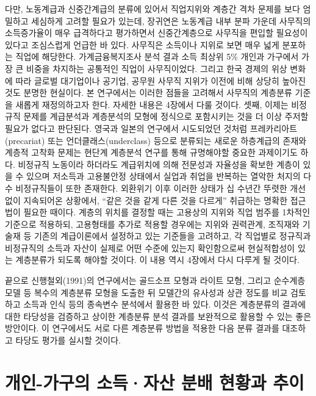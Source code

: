 \documentclass[
  letterpaper,
  DIV=11,
  numbers=noendperiod]{scrartcl}
\begin{document}
다만, 노동계급과 신중간계급의 분류에 있어서 직업지위와 계층간 격차
문제를 보다 엄밀하고 세심하게 고려할 필요가 있는데, 장귀연은 노동계급
내부 분파 가운데 사무직의 소득증가율이 매우 급격하다고 평가하면서
신중간계층으로 사무직을 편입할 필요성이 있다고 조심스럽게 언급한 바
있다. 사무직은 소득이나 지위로 보면 매우 넓게 분포하는 직업에 해당한다.
가계금융복지조사 분석 결과 소득 최상위 5\% 개인과 가구에서 가장 큰
비중을 차지하는 공통적인 직업이 사무직이었다. 그리고 한국 경제의 위상
변화에 따라 글로벌 대기업이나 공기업, 공무원 사무직 지위가 이전에 비해
상당히 높아진 것도 분명한 현실이다. 본 연구에서는 이러한 점들을 고려해서
사무직의 계층분류 기준을 새롭게 재정의하고자 한다. 자세한 내용은 4장에서
다룰 것이다. 셋째, 이제는 비정규직 문제를 계급분석과 계층분석의 모형에
정식으로 포함시키는 것을 더 이상 주저할 필요가 없다고 판단된다. 영국과
일본의 연구에서 시도되었던 것처럼 프레카리아트(precariat) 또는
언더클래스(underclass) 등으로 분류되는 새로운 하층계급의 존재와 계층적
고착화 문제는 현단계 계층분석 연구를 통해 규명해야할 중요한 과제이기도
하다. 비정규직 노동이라 하더라도 계급위치에 의해 전문성과 자율성을
확보한 계층이 있을 수 있으며 저소득과 고용불안정 상태에서 실업과 취업을
반복하는 열악한 처지의 다수 비정규직들이 또한 존재한다. 외환위기 이후
이러한 상태가 십 수년간 뚜렷한 개선 없이 지속되어온 상황에서, ``같은
것을 같게 다른 것을 다르게'' 취급하는 명확한 접근법이 필요한 때이다.
계층의 위치를 결정할 때는 고용상의 지위와 직업 범주를 1차적인 기준으로
적용하되, 고용형태를 추가로 적용할 경우에는 지위와 권력관계, 조직재와
기술재 등 기존의 계급이론에서 설정하고 있는 기준들을 고려하고, 각
직업별로 정규직과 비정규직의 소득과 자산이 실제로 어떤 수준에 있는지
확인함으로써 현실적합성이 있는 계층분류가 되도록 해야할 것이다. 이 내용
역시 4장에서 다시 다루게 될 것이다.

끝으로 신행철외(1991)의 연구에서는 골드소프 모형과 라이트 모형, 그리고
순수계층모델 등 복수의 계층분류 모형을 도출한 뒤 모델간의 유사성과 상관
정도를 비교 검토하고 소득과 인식 등의 종속변수 분석에서 활용한 바 있다.
이것은 계층분류의 결과에 대한 타당성을 검증하고 상이한 계층분류 분석
결과를 보완적으로 활용할 수 있는 좋은 방안이다. 이 연구에서도 서로 다른
계층분류 방법을 적용한 다음 분류 결과를 대조하고 타당도 평가를 실시할
것이다.

\section{개인-가구의 소득·자산 분배 현황과
추이}\label{uxac1cuxc778-uxac00uxad6cuxc758-uxc18cuxb4dduxc790uxc0b0-uxbd84uxbc30-uxd604uxd669uxacfc-uxcd94uxc774}
\end{document}
